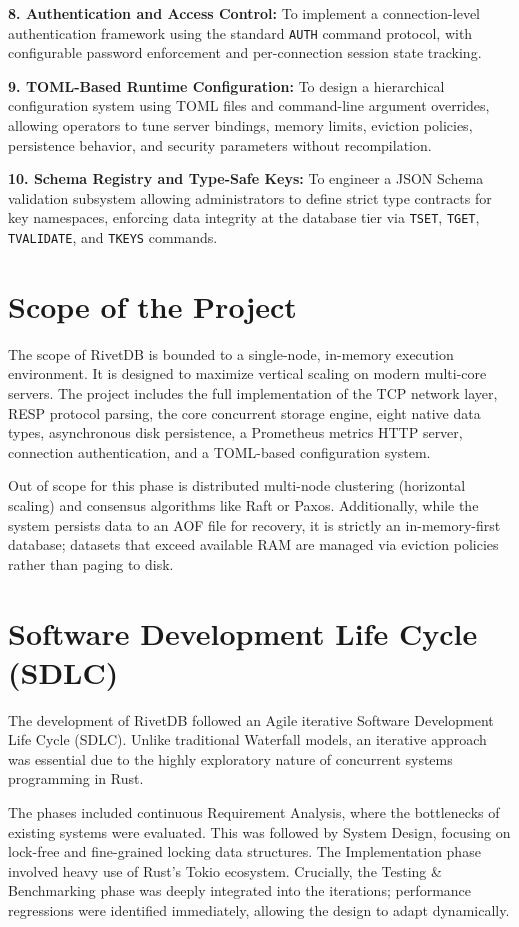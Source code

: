\textbf{8. Authentication and Access Control:} To implement a connection-level authentication framework using the standard \texttt{AUTH} command protocol, with configurable password enforcement and per-connection session state tracking.

\textbf{9. TOML-Based Runtime Configuration:} To design a hierarchical configuration system using TOML files and command-line argument overrides, allowing operators to tune server bindings, memory limits, eviction policies, persistence behavior, and security parameters without recompilation.

\textbf{10. Schema Registry and Type-Safe Keys:} To engineer a JSON Schema validation subsystem allowing administrators to define strict type contracts for key namespaces, enforcing data integrity at the database tier via \texttt{TSET}, \texttt{TGET}, \texttt{TVALIDATE}, and \texttt{TKEYS} commands.

\section{Scope of the Project}
The scope of RivetDB is bounded to a single-node, in-memory execution environment. It is designed to maximize vertical scaling on modern multi-core servers. The project includes the full implementation of the TCP network layer, RESP protocol parsing, the core concurrent storage engine, eight native data types, asynchronous disk persistence, a Prometheus metrics HTTP server, connection authentication, and a TOML-based configuration system. 

Out of scope for this phase is distributed multi-node clustering (horizontal scaling) and consensus algorithms like Raft or Paxos. Additionally, while the system persists data to an AOF file for recovery, it is strictly an in-memory-first database; datasets that exceed available RAM are managed via eviction policies rather than paging to disk.

\section{Software Development Life Cycle (SDLC)}
The development of RivetDB followed an Agile iterative Software Development Life Cycle (SDLC). Unlike traditional Waterfall models, an iterative approach was essential due to the highly exploratory nature of concurrent systems programming in Rust.

The phases included continuous Requirement Analysis, where the bottlenecks of existing systems were evaluated. This was followed by System Design, focusing on lock-free and fine-grained locking data structures. The Implementation phase involved heavy use of Rust's Tokio ecosystem. Crucially, the Testing \& Benchmarking phase was deeply integrated into the iterations; performance regressions were identified immediately, allowing the design to adapt dynamically.

